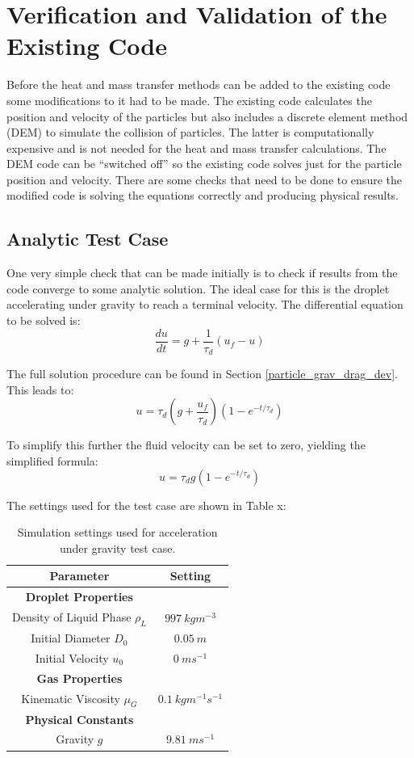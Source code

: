\documentclass[../Interim_Report_Master]{subfiles}
\begin{document}
\hypertarget{v_and_v}{\section{Verification and Validation of the Existing Code}\label{v_and_v}}
Before the heat and mass transfer methods can be added to the existing code some modifications to it had to be made. The existing code calculates the position and velocity of the particles but also includes a discrete element method (DEM) to simulate the collision of particles. The latter is computationally expensive and is not needed for the heat and mass transfer calculations. The DEM code can be ``switched off'' so the existing code solves just for the particle position and velocity. There are some checks that need to be done to ensure the modified code is solving the equations correctly and producing physical results.

\subsection{Analytic Test Case}\label{an_test}
One very simple check that can be made initially is to check if results from the code converge to some analytic solution. The ideal case for this is the droplet accelerating under gravity to reach a terminal velocity. The differential equation to be solved is:
\begin{equation}
\frac{du}{dt} = g + \frac{1}{\tau_d}(u_f-u)
\end{equation}

The full solution procedure can be found in Section \ref{particle_grav_drag_dev}. This leads to:
\begin{equation}
u = \tau_d\left(g + \frac{u_f}{\tau_d}\right)(1-e^{-t/\tau_d})
\end{equation}

To simplify this further the fluid velocity can be set to zero, yielding the simplified formula: 
\begin{equation}
u = \tau_d g(1-e^{-t/\tau_d})
\end{equation}

The settings used for the test case are shown in Table x:
\begin{table}[h]
	\centering
	\begin{tabular}{|c c|}
		\hline
		\textbf{Parameter} & \textbf{Setting} \\ \hline
		\textbf{Droplet Properties} &  \\ 
		Density of Liquid Phase $\rho_L$ & $997~kgm^{-3}$ \\
		Initial Diameter ${D_0}$ & $0.05~m$ \\ 
		Initial Velocity $u_0$ & $0~ms^{-1}$ \\ \hline 
		\textbf{Gas Properties} &  \\ 
		Kinematic Viscosity $\mu_G$ & $0.1~kgm^{-1}s^{-1}$ \\ \hline
		\textbf{Physical Constants} &  \\ 
		Gravity $g$ & $9.81~ms^{-1}$ \\ \hline
	\end{tabular}
	\caption{Simulation settings used for acceleration under gravity test case.}
\end{table}
\end{document}
